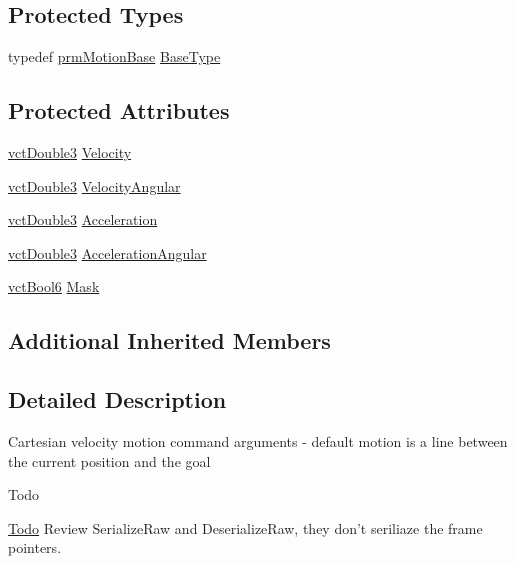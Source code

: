 \subsection*{Protected Types}
\begin{DoxyCompactItemize}
\item 
typedef \hyperlink{classprm_motion_base}{prm\-Motion\-Base} \hyperlink{classprm_velocity_cartesian_set_ade8ba9bb6ac994b5e7fd11084d3f54f1}{Base\-Type}
\end{DoxyCompactItemize}
\subsection*{Protected Attributes}
\begin{DoxyCompactItemize}
\item 
\hyperlink{vct_fixed_size_vector_types_8h_a4a89122c9d7f72c3f31fe8126e17c3af}{vct\-Double3} \hyperlink{classprm_velocity_cartesian_set_a8cc967fe13fe3167899f35394ef46dd0}{Velocity}
\item 
\hyperlink{vct_fixed_size_vector_types_8h_a4a89122c9d7f72c3f31fe8126e17c3af}{vct\-Double3} \hyperlink{classprm_velocity_cartesian_set_a9d72325c32e55acfe48be69131f34fc3}{Velocity\-Angular}
\item 
\hyperlink{vct_fixed_size_vector_types_8h_a4a89122c9d7f72c3f31fe8126e17c3af}{vct\-Double3} \hyperlink{classprm_velocity_cartesian_set_a06731c23de2a0df1e3bcb7c4a06e988f}{Acceleration}
\item 
\hyperlink{vct_fixed_size_vector_types_8h_a4a89122c9d7f72c3f31fe8126e17c3af}{vct\-Double3} \hyperlink{classprm_velocity_cartesian_set_a8a5727216f0caf109547c0cfd3ae6e43}{Acceleration\-Angular}
\item 
\hyperlink{vct_fixed_size_vector_types_8h_a1494a41869ce763813f2bf7f922b8fdd}{vct\-Bool6} \hyperlink{classprm_velocity_cartesian_set_aac00bb3d01fc051ac28f1ae32e06cfab}{Mask}
\end{DoxyCompactItemize}
\subsection*{Additional Inherited Members}


\subsection{Detailed Description}
Cartesian velocity motion command arguments -\/ default motion is a line between the current position and the goal\begin{DoxyRefDesc}{Todo}
\item[\hyperlink{todo__todo000011}{Todo}]Review Serialize\-Raw and Deserialize\-Raw, they don't seriliaze the frame pointers. \end{DoxyRefDesc}


